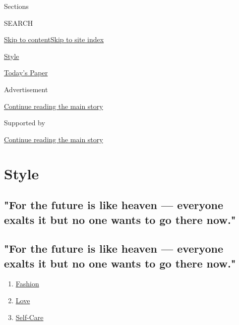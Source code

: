 Sections

SEARCH

\protect\hyperlink{site-content}{Skip to
content}\protect\hyperlink{site-index}{Skip to site index}

\href{https://www.nytimes3xbfgragh.onion/section/style}{Style}

\href{https://myaccount.nytimes3xbfgragh.onion/auth/login?response_type=cookie\&client_id=vi}{}

\href{https://www.nytimes3xbfgragh.onion/section/todayspaper}{Today's
Paper}

Advertisement

\protect\hyperlink{after-top}{Continue reading the main story}

Supported by

\protect\hyperlink{after-sponsor}{Continue reading the main story}

\hypertarget{style}{%
\section{Style}\label{style}}

\hypertarget{for-the-future-is-like-heaven--everyone-exalts-it-but-no-one-wants-to-go-there-now}{%
\subsection{"For the future is like heaven --- everyone exalts it but no
one wants to go there
now."}\label{for-the-future-is-like-heaven--everyone-exalts-it-but-no-one-wants-to-go-there-now}}

\hypertarget{for-the-future-is-like-heaven--everyone-exalts-it-but-no-one-wants-to-go-there-now-1}{%
\subsection{"For the future is like heaven --- everyone exalts it but no
one wants to go there
now."}\label{for-the-future-is-like-heaven--everyone-exalts-it-but-no-one-wants-to-go-there-now-1}}

\begin{enumerate}
\def\labelenumi{\arabic{enumi}.}
\tightlist
\item
  \href{/section/fashion}{Fashion}
\item
  \href{/section/style/love}{Love}
\item
  \href{/section/style/self-care}{Self-Care}
\end{enumerate}

